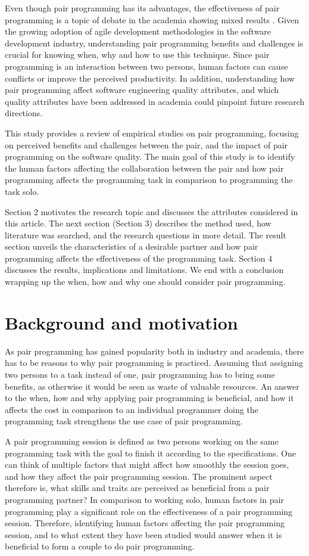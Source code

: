 \documentclass[conference]{IEEEtran}
\begin{document}
Even though pair programming has its advantages, the effectiveness of pair programming is a topic of debate in the academia showing mixed results \cite{Hannay2009effectiveness}. Given the growing adoption of agile development methodologies in the software development industry, understanding pair programming benefits and challenges is crucial for knowing when, why and how to use this technique. Since pair programming is an interaction between two persons, human factors can cause conflicts or improve the perceived productivity. In addition, understanding how pair programming affect software engineering quality attributes, and which quality attributes have been addressed in academia could pinpoint future research directions.

This study provides a review of empirical studies on pair programming, focusing on perceived benefits and challenges between the pair, and the impact of pair programming on the software quality. The main goal of this study is to identify the human factors affecting the collaboration between the pair and how pair programming affects the programming task in comparison to programming the task solo.

Section 2 motivates the research topic and discusses the attributes considered in this article. The next section (Section 3) describes the method used, how literature was searched, and the research questions in more detail. The result section unveils the characteristics of a desirable partner and how pair programming affects the effectiveness of the programming task. Section 4 discusses the results, implications and limitations. We end with a conclusion wrapping up the when, how and why one should consider pair programming.

\section{Background and motivation}

As pair programming has gained popularity both in industry and academia, there has to be reasons to why pair programming is practiced. Assuming that assigning two persons to a task instead of one, pair programming has to bring some benefits, as otherwise it would be seen as waste of valuable resources. An answer to the when, how and why applying pair programming is beneficial, and how it affects the cost in comparison to an individual programmer doing the programming task strengthens the use case of pair programming.

A pair programming session is defined as two persons working on the same programming task with the goal to finish it according to the specifications. One can think of multiple factors that might affect how smoothly the session goes, and how they affect the pair programming session. The prominent aspect therefore is, what skills and traits are perceived as beneficial from a pair programming partner? In comparison to working solo, human factors in pair programming play a significant role on the effectiveness of a pair programming session. Therefore, identifying human factors affecting the pair programming session, and to what extent they have been studied would answer when it is beneficial to form a couple to do pair programming.
\end{document}
